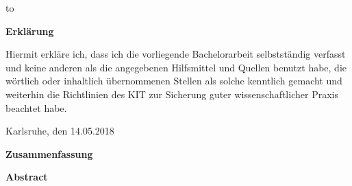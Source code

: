 \thispagestyle{empty}
\vspace*{37\baselineskip}
\hbox to \textwidth{\hrulefill}
\par
\textbf{Erklärung}

Hiermit erkl\"are ich,
dass ich die vorliegende Bachelorarbeit selbstst\"andig verfasst und keine anderen als die angegebenen Hilfsmittel und Quellen benutzt habe,
die w\"ortlich oder inhaltlich \"ubernommenen Stellen als solche kenntlich gemacht und weiterhin die Richtlinien des KIT zur Sicherung guter wissenschaftlicher Praxis beachtet habe.

Karlsruhe, den 14.05.2018

\cleardoublepage

\vspace*{1em}
\begin{center}
	\textbf{Zusammenfassung}
\end{center}
\par
{}
\cleardoublepage
\vspace*{1em}
\begin{center}
	\textbf{Abstract}
\end{center}
\par
{}

\cleardoublepage
